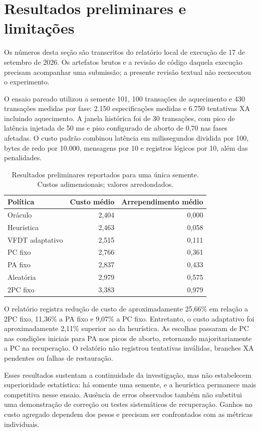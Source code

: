 \documentclass[12pt,a4paper]{article}
\begin{document}
\section{Resultados preliminares e limitações}
Os números desta seção são transcritos do relatório local de execução de 17 de setembro de 2026. Os artefatos brutos e a revisão de código daquela execução precisam acompanhar uma submissão; a presente revisão textual não reexecutou o experimento.

O ensaio pareado utilizou a semente 101, 100 transações de aquecimento e 430 transações medidas por fase: 2.150 especificações medidas e 6.750 tentativas XA incluindo aquecimento. A janela histórica foi de 30 transações, com pico de latência injetada de 50 ms e piso configurado de aborto de 0,70 nas fases afetadas. O custo padrão combinou latência em milissegundos dividida por 100, bytes de redo por 10.000, mensagens por 10 e registros lógicos por 10, além das penalidades.

\begin{table}[htbp]
\centering
\caption{Resultados preliminares reportados para uma única semente. Custos adimensionais; valores arredondados.}
\label{tab:results}
\begin{tabular}{lrr}
\toprule Política & Custo médio & Arrependimento médio \\
\midrule
Oráculo & 2,404 & 0,000 \\
Heurística & 2,463 & 0,058 \\
VFDT adaptativo & 2,515 & 0,111 \\
PC fixo & 2,766 & 0,361 \\
PA fixo & 2,837 & 0,433 \\
Aleatória & 2,979 & 0,575 \\
2PC fixo & 3,383 & 0,979 \\
\bottomrule
\end{tabular}
\end{table}

O relatório registra redução de custo de aproximadamente 25,66\% em relação a 2PC fixo, 11,36\% a PA fixo e 9,07\% a PC fixo. Entretanto, o custo adaptativo foi aproximadamente 2,11\% superior ao da heurística. As escolhas passaram de PC nas condições iniciais para PA nos picos de aborto, retornando majoritariamente a PC na recuperação. O relatório não registrou tentativas inválidas, branches XA pendentes ou falhas de restauração.

Esses resultados sustentam a continuidade da investigação, mas não estabelecem superioridade estatística: há somente uma semente, e a heurística permanece mais competitiva nesse ensaio. Ausência de erros observados também não substitui uma demonstração de correção ou testes sistemáticos de recuperação. Ganhos no custo agregado dependem dos pesos e precisam ser confrontados com as métricas individuais.
\end{document}
